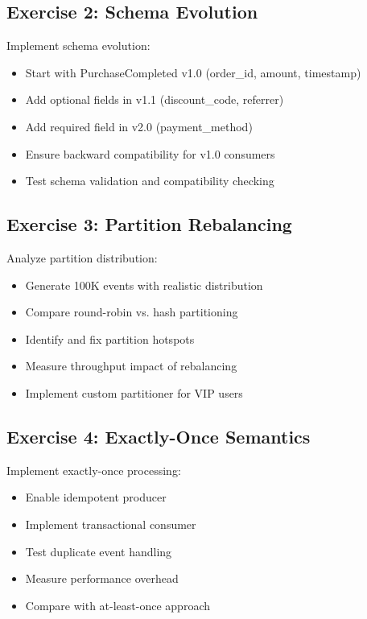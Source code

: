 \subsection{Exercise 2: Schema Evolution}

Implement schema evolution:
\begin{itemize}
    \item Start with PurchaseCompleted v1.0 (order\_id, amount, timestamp)
    \item Add optional fields in v1.1 (discount\_code, referrer)
    \item Add required field in v2.0 (payment\_method)
    \item Ensure backward compatibility for v1.0 consumers
    \item Test schema validation and compatibility checking
\end{itemize}

\subsection{Exercise 3: Partition Rebalancing}

Analyze partition distribution:
\begin{itemize}
    \item Generate 100K events with realistic distribution
    \item Compare round-robin vs. hash partitioning
    \item Identify and fix partition hotspots
    \item Measure throughput impact of rebalancing
    \item Implement custom partitioner for VIP users
\end{itemize}

\subsection{Exercise 4: Exactly-Once Semantics}

Implement exactly-once processing:
\begin{itemize}
    \item Enable idempotent producer
    \item Implement transactional consumer
    \item Test duplicate event handling
    \item Measure performance overhead
    \item Compare with at-least-once approach
\end{itemize}

